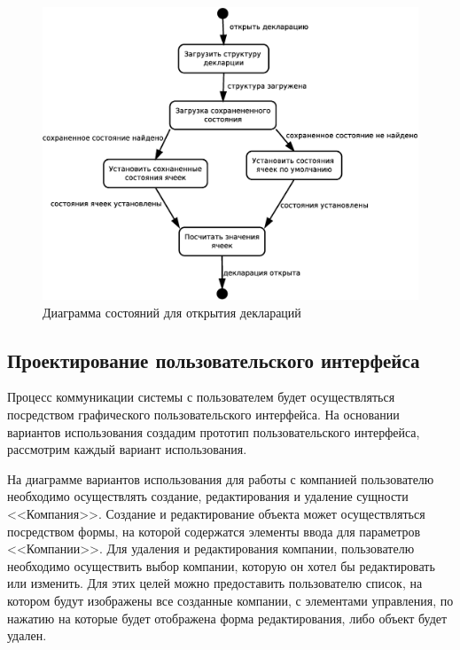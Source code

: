 \documentclass[14pt,a4paper]{reportmod}
\begin{document}
\begin{figure}
  \centering
  \includegraphics[scale=0.4]{uml/states_1}
  \caption{Диаграмма состояний для открытия деклараций}
  \label{pic:states_1}
\end{figure}

\subsection{Проектирование пользовательского интерфейса}

Процесс коммуникации системы с пользователем будет осуществляться посредством графического пользовательского интерфейса. На основании вариантов использования создадим прототип пользовательского интерфейса, рассмотрим каждый вариант использования.

На диаграмме вариантов использования для работы с компанией пользователю необходимо осуществлять создание, редактирования и удаление сущности <<Компания>>. Создание и редактирование объекта может осуществляться посредством формы, на которой содержатся элементы ввода для параметров <<Компании>>.
Для удаления и редактирования компании, пользователю необходимо осуществить выбор компании, которую он хотел бы редактировать или изменить. Для этих целей можно предоставить пользователю список, на котором будут изображены все созданные компании, с элементами управления, по нажатию на которые будет отображена форма редактирования, либо объект будет удален.
\end{document}
